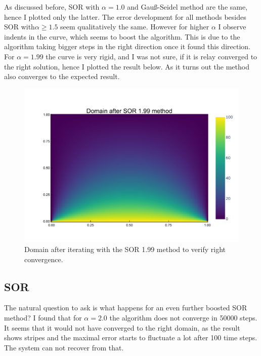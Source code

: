 \documentclass[
	a4paper, %
	10pt, %
]{CSUniSchoolLabReport}
\begin{document}
As discussed before, SOR with $\alpha=1.0$ and Gauß-Seidel method are the same, hence I plotted only the latter. The error development for all methods besides SOR with$\alpha\geq 1.5$ seem qualitatively the same. However for higher $\alpha$ I observe indents in the curve, which seems to boost the algorithm. This is due to the algorithm taking bigger steps in the right direction once it found this direction. 
For $\alpha=1.99$ the curve is very rigid, and I was not sure, if it is relay converged to the right solution, hence I plotted the result below. As it turns out the method also converges to the expected result.

\begin{figure}[H]
	\includegraphics[width=\textwidth]{../saves_t1/sor199_heatmap.pdf}
	\caption{Domain after iterating with the SOR 1.99 method to verify right convergence.}
\end{figure}

\subsection{SOR}

The natural question to ask is what happens for an even further boosted SOR method? I found that for $\alpha = 2.0$ the algorithm does not converge in  50000 steps. It seems that it would not have converged to the right domain, as the result shows stripes and the maximal error starts to fluctuate a lot after 100 time steps. The system can not recover from that.
\end{document}
